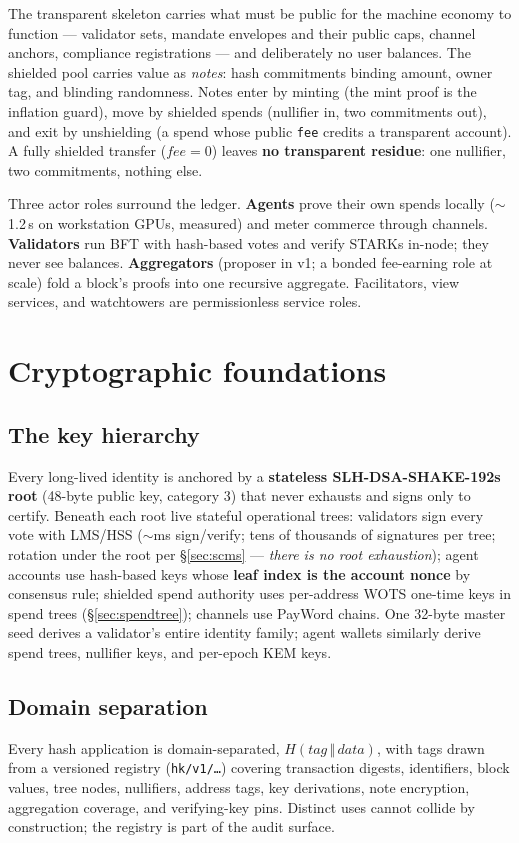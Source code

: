 \documentclass[11pt]{article}
\newcommand{\ct}[1]{\texttt{#1}}
\begin{document}
The transparent skeleton carries what must be public for the machine economy to function --- validator sets, mandate envelopes and their public caps, channel anchors, compliance registrations --- and deliberately no user balances. The shielded pool carries value as \emph{notes}: hash commitments binding amount, owner tag, and blinding randomness. Notes enter by minting (the mint proof is the inflation guard), move by shielded spends (nullifier in, two commitments out), and exit by unshielding (a spend whose public \ct{fee} credits a transparent account). A fully shielded transfer ($\mathit{fee}=0$) leaves \textbf{no transparent residue}: one nullifier, two commitments, nothing else.

Three actor roles surround the ledger. \textbf{Agents} prove their own spends locally ($\sim$1.2\,s on workstation GPUs, measured) and meter commerce through channels. \textbf{Validators} run BFT with hash-based votes and verify STARKs in-node; they never see balances. \textbf{Aggregators} (proposer in v1; a bonded fee-earning role at scale) fold a block's proofs into one recursive aggregate. Facilitators, view services, and watchtowers are permissionless service roles.

\section{Cryptographic foundations}
\subsection{The key hierarchy}
Every long-lived identity is anchored by a \textbf{stateless SLH-DSA-SHAKE-192s root} (48-byte public key, category 3) that never exhausts and signs only to certify. Beneath each root live stateful operational trees: validators sign every vote with LMS/HSS ($\sim$ms sign/verify; tens of thousands of signatures per tree; rotation under the root per \S\ref{sec:scms} --- \emph{there is no root exhaustion}); agent accounts use hash-based keys whose \textbf{leaf index is the account nonce} by consensus rule; shielded spend authority uses per-address WOTS one-time keys in spend trees (\S\ref{sec:spendtree}); channels use PayWord chains. One 32-byte master seed derives a validator's entire identity family; agent wallets similarly derive spend trees, nullifier keys, and per-epoch KEM keys.

\subsection{Domain separation}
Every hash application is domain-separated, $H(\mathit{tag}\,\Vert\,\mathit{data})$, with tags drawn from a versioned registry (\ct{hk/v1/\ldots}) covering transaction digests, identifiers, block values, tree nodes, nullifiers, address tags, key derivations, note encryption, aggregation coverage, and verifying-key pins. Distinct uses cannot collide by construction; the registry is part of the audit surface.
\end{document}
